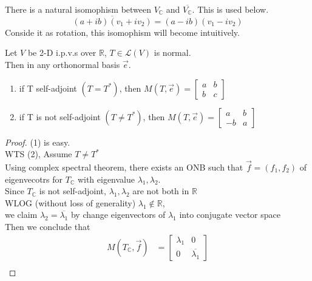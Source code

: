 \documentclass{aq-notes}
\begin{document}
\begin{claim}
        There is a natural isomophism between $V_\mathbb{C}$ and $\overline{V_\mathbb{C}}$. This is used below.
        \[\overline{(a+ib)(v_1+iv_2)} = (a-ib)(v_1 - iv_2)\]
        Conside it as rotation, this isomophism will become intuitively.
\end{claim}
    \begin{theorem}
        Let $V$ be 2-D i.p.v.s over $\mathbb{R}$, $T\in \mathcal{L}(V)$ is normal.\\
        Then in any orthonormal basis $\vec e$.
        \begin{enumerate}
            \item if T self-adjoint $(T=T^*)$, then $\displaystyle M(T, \vec e) = 
            \begin{bmatrix}
                a & b \\
                b & c
            \end{bmatrix}$
            \item if T is not self-adjoint $(T\neq T^*)$, then $\displaystyle M(T, \vec e) = 
            \begin{bmatrix}
                a & b \\
                -b & a
            \end{bmatrix}$
        \end{enumerate}
        \begin{proof}
            (1) is easy.\\
            WTS (2), Assume $T\neq T^*$\\
            Using complex spectral theorem, there exists an ONB such that $\vec f = (f_1, f_2)$ of eigenvecotrs for $T_\mathbb{C}$ with eigenvalue $\lambda_1, \lambda_2$.\\
            Since $T_\mathbb{C}$ is not self-adjoint, $\lambda_1, \lambda_2$ are not both in $\mathbb{R}$\\
            WLOG (without loss of generality) $\lambda_1 \not \in \mathbb{R}$,\\ 
            we claim $\lambda_2 = \overline{\lambda_1}$ by change eigenvectors of $\lambda_1$ into conjugate vector space\\
            Then we conclude that 
            \begin{align*}
                M(T_\mathbb{C},\vec f) &= \begin{bmatrix}
                    \lambda_1 & 0\\
                    0 & \overline{\lambda_1}
                \end{bmatrix}\\

\end{align*}
\end{proof}
\end{theorem}
\end{document}

